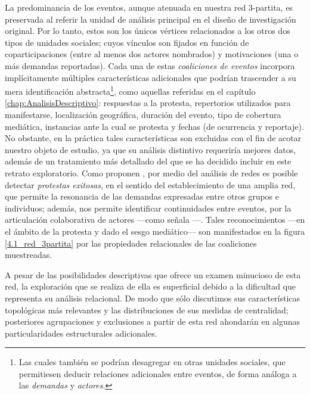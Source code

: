 \documentclass[letterpaper, 11pt]{book}
\theoremstyle{definition}
\theoremstyle{remark}
\begin{document}
La predominancia de los eventos, aunque atenuada en nuestra red 3-partita, es preservada al referir la unidad de análisis principal en el diseño de investigación original. 
Por lo tanto, estos son los únicos vértices relacionados a los otros dos tipos de unidades sociales; cuyos vínculos son fijados en función de coparticipaciones (entre al menos dos actores nombrados) y motivaciones (una o más demandas reportadas). 
Cada una de estas \emph{coaliciones de eventos} incorpora implícitamente múltiples características adicionales que podrían trascender a su mera identificación abstracta\footnote{
    Las cuales también se podrían desagregar en otras unidades sociales, que permitiesen deducir relaciones adicionales entre eventos, de forma análoga a las \emph{demandas} y \emph{actores}.
}, como aquellas referidas en el capítulo \ref{chap:AnalisisDescriptivo}: respuestas a la protesta, repertorios utilizados para manifestarse, localización geográfica, duración del evento, tipo de cobertura mediática, instancias ante la cual se protesta y fechas (de ocurrencia y reportaje). 
No obstante, en la práctica tales características son excluidas con el fin de acotar nuestro objeto de estudio, ya que su análisis distintivo requeriría mejores datos, además de un tratamiento más detallado del que se ha decidido incluir en este retrato exploratorio. 
Como proponen \citet{1993_BrmanEvtt_StructureSocialProtest}, por medio del análisis de redes es posible detectar \emph{protestas exitosas}, en el sentido del establecimiento de una amplia red, que permite la resonancia de las demandas expresadas entre otros grupos e individuos; además, nos permite identificar continuidades entre eventos, por la articulación colaborativa de actores ---como señala \citet{2003_Diani_SocialNetworks}---. 
Tales reconocimientos ---en el ámbito de la protesta y dado el sesgo mediático--- son manifestados en la figura \ref{4.1_red_3partita} por las propiedades relacionales de las coaliciones muestreadas. 


A pesar de las posibilidades descriptivas que ofrece un examen minucioso de esta red, la exploración que se realiza de ella es superficial debido a la dificultad que representa su análisis relacional. 
De modo que sólo discutimos sus características topológicas más relevantes y las distribuciones de sus medidas de centralidad; posteriores agrupaciones y exclusiones a partir de esta red ahondarán en algunas particularidades estructurales adicionales. 



\end{document}
